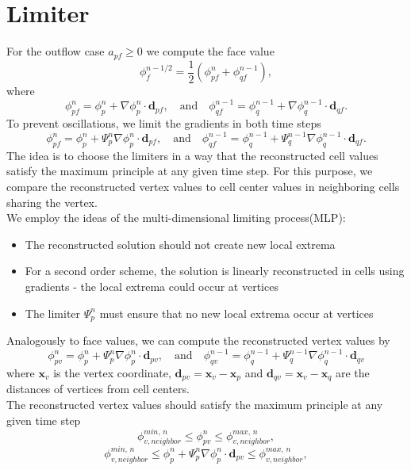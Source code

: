 \documentclass{article}
\begin{document}
\section{Limiter}
For the outflow case $ a_{pf} \geq 0 $ we compute the face value
\[ \phi_{f}^{n-1/2} = \frac{1}{2}(\phi_{pf}^n + \phi_{qf}^{n-1}), \]
where 
\[ \phi_{pf}^{n} = \phi_p^{n} + \nabla\phi_p^{n}\cdot\boldsymbol{d}_{pf},
\quad \text{and} \quad
\phi_{qf}^{n-1} = \phi_q^{n-1} + \nabla\phi_q^{n-1}\cdot\boldsymbol{d}_{qf}. \]
To prevent oscillations, we limit the gradients in both time steps
\[ \phi_{pf}^{n} = \phi_p^{n} + \Psi_p^{n}\nabla\phi_p^{n}\cdot\boldsymbol{d}_{pf},
\quad \text{and} \quad
\phi_{qf}^{n-1} = \phi_q^{n-1} + \Psi_q^{n-1}\nabla\phi_q^{n-1}\cdot\boldsymbol{d}_{qf}. \]
The idea is to choose the limiters in a way that the reconstructed cell values satisfy the maximum principle at any given time step. For this purpose, we compare the reconstructed vertex values to cell center values in neighboring cells sharing the vertex.\\
We employ the ideas of the multi-dimensional limiting process(MLP):
\begin{itemize}
	\item The reconstructed solution should not create new local extrema
	\item For a second order scheme, the solution is linearly reconstructed in cells using gradients - the local extrema could occur at vertices
	\item The limiter $ \Psi_p^n $ must ensure that no new local extrema occur at vertices
\end{itemize}
Analogously to face values, we can compute the reconstructed vertex values by
\begin{equation} \label{face_vals}
	\phi_{pv}^{n} = \phi_p^{n} + \Psi_p^{n}\nabla\phi_p^{n}\cdot\boldsymbol{d}_{pv},
	\quad \text{and} \quad
	\phi_{qv}^{n-1} = \phi_q^{n-1} + \Psi_q^{n-1}\nabla\phi_q^{n-1}\cdot\boldsymbol{d}_{qv}
\end{equation}
where $ \boldsymbol{x}_v $ is the vertex coordinate, $ \boldsymbol{d}_{pv} = \boldsymbol{x}_v - \boldsymbol{x}_p $ and $ \boldsymbol{d}_{qv} = \boldsymbol{x}_v - \boldsymbol{x}_q $ are the distances of vertices from cell centers.\\
The reconstructed vertex values should satisfy the maximum principle at any given time step
\[ \phi_{v, neighbor}^{min,\,n} \leq \phi_{pv}^{n} \leq \phi_{v, neighbor}^{max,\,n},\]
\[ \phi_{v, neighbor}^{min,\,n} \leq \phi_p^{n} + \Psi_p^{n}\nabla\phi_p^{n}\cdot\boldsymbol{d}_{pv} \leq \phi_{v, neighbor}^{max,\,n}, \]
\end{document}
